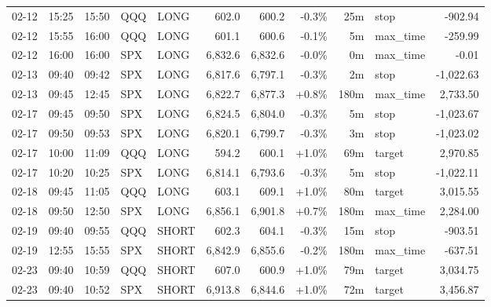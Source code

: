 \documentclass[11pt,a4paper,twoside]{article}
\begin{document}
\begin{center}
\begin{longtable}{>{\color{txtmain}}l l l l l r r r r >{\color{txtmain}}l r}
02-12 & 15:25 & 15:50 & QQQ & LONG & 602.0 & 600.2 & \textcolor{lossred}{-0.3\%} & 25m & stop & \textcolor{lossred}{-902.94} \\
02-12 & 15:55 & 16:00 & QQQ & LONG & 601.1 & 600.6 & \textcolor{lossred}{-0.1\%} & 5m & max\_time & \textcolor{lossred}{-259.99} \\
02-12 & 16:00 & 16:00 & SPX & LONG & 6,832.6 & 6,832.6 & \textcolor{lossred}{-0.0\%} & 0m & max\_time & \textcolor{lossred}{-0.01} \\
02-13 & 09:40 & 09:42 & SPX & LONG & 6,817.6 & 6,797.1 & \textcolor{lossred}{-0.3\%} & 2m & stop & \textcolor{lossred}{-1,022.63} \\
02-13 & 09:45 & 12:45 & SPX & LONG & 6,822.7 & 6,877.3 & \textcolor{wingreen}{+0.8\%} & 180m & max\_time & \textcolor{wingreen}{2,733.50} \\
02-17 & 09:45 & 09:50 & SPX & LONG & 6,824.5 & 6,804.0 & \textcolor{lossred}{-0.3\%} & 5m & stop & \textcolor{lossred}{-1,023.67} \\
02-17 & 09:50 & 09:53 & SPX & LONG & 6,820.1 & 6,799.7 & \textcolor{lossred}{-0.3\%} & 3m & stop & \textcolor{lossred}{-1,023.02} \\
02-17 & 10:00 & 11:09 & QQQ & LONG & 594.2 & 600.1 & \textcolor{wingreen}{+1.0\%} & 69m & target & \textcolor{wingreen}{2,970.85} \\
02-17 & 10:20 & 10:25 & SPX & LONG & 6,814.1 & 6,793.6 & \textcolor{lossred}{-0.3\%} & 5m & stop & \textcolor{lossred}{-1,022.11} \\
02-18 & 09:45 & 11:05 & QQQ & LONG & 603.1 & 609.1 & \textcolor{wingreen}{+1.0\%} & 80m & target & \textcolor{wingreen}{3,015.55} \\
02-18 & 09:50 & 12:50 & SPX & LONG & 6,856.1 & 6,901.8 & \textcolor{wingreen}{+0.7\%} & 180m & max\_time & \textcolor{wingreen}{2,284.00} \\
02-19 & 09:40 & 09:55 & QQQ & SHORT & 602.3 & 604.1 & \textcolor{lossred}{-0.3\%} & 15m & stop & \textcolor{lossred}{-903.51} \\
02-19 & 12:55 & 15:55 & SPX & SHORT & 6,842.9 & 6,855.6 & \textcolor{lossred}{-0.2\%} & 180m & max\_time & \textcolor{lossred}{-637.51} \\
02-23 & 09:40 & 10:59 & QQQ & SHORT & 607.0 & 600.9 & \textcolor{wingreen}{+1.0\%} & 79m & target & \textcolor{wingreen}{3,034.75} \\
02-23 & 09:40 & 10:52 & SPX & SHORT & 6,913.8 & 6,844.6 & \textcolor{wingreen}{+1.0\%} & 72m & target & \textcolor{wingreen}{3,456.87} \\

\end{longtable}
\end{center}
\end{document}
